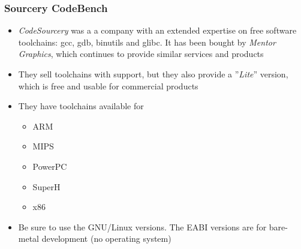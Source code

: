 \begin{frame}
  \frametitle{Sourcery CodeBench}
  \begin{itemize}
  \item {\em CodeSourcery} was a a company with an extended expertise
    on free software toolchains: gcc, gdb, binutils and glibc. It has
    been bought by {\em Mentor Graphics}, which continues to provide
    similar services and products
  \item They sell toolchains with support, but they also provide a
    ”{\em Lite}” version, which is free and usable for commercial
    products
  \item They have toolchains available for
    \begin{itemize}
    \item ARM
    \item MIPS
    \item PowerPC
    \item SuperH
    \item x86
    \end{itemize}
  \item Be sure to use the GNU/Linux versions. The EABI versions are
    for bare-metal development (no operating system)
  \end{itemize}
\end{frame}


